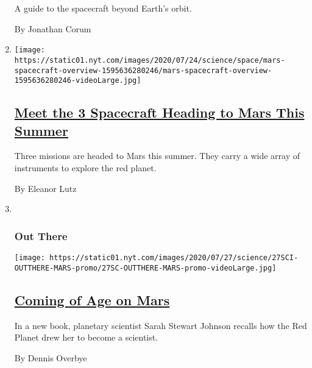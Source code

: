 \begin{enumerate}
  A guide to the spacecraft beyond Earth's orbit.

  By Jonathan Corum
\item
  \texttt{[image: https://static01.nyt.com/images/2020/07/24/science/space/mars-spacecraft-overview-1595636280246/mars-spacecraft-overview-1595636280246-videoLarge.jpg]}

  \hypertarget{meet-the-3-spacecraft-heading-to-mars-this-summer}{%
  \subsection{\texorpdfstring{\href{/interactive/2020/science/mars-perseverance-tianwen-hope.html}{Meet
  the 3 Spacecraft Heading to Mars This
  Summer}}{Meet the 3 Spacecraft Heading to Mars This Summer}}\label{meet-the-3-spacecraft-heading-to-mars-this-summer}}

  Three missions are headed to Mars this summer. They carry a wide array
  of instruments to explore the red planet.

  By Eleanor Lutz
\item ~
  \hypertarget{out-there}{%
  \subsubsection{Out There}\label{out-there}}

  \texttt{[image: https://static01.nyt.com/images/2020/07/27/science/27SCI-OUTTHERE-MARS-promo/27SC-OUTTHERE-MARS-promo-videoLarge.jpg]}

  \hypertarget{coming-of-age-on-mars}{%
  \subsection{\texorpdfstring{\href{/2020/07/27/science/mars-sarah-stewart-johnson.html}{Coming
  of Age on Mars}}{Coming of Age on Mars}}\label{coming-of-age-on-mars}}

  In a new book, planetary scientist Sarah Stewart Johnson recalls how
  the Red Planet drew her to become a scientist.

  By Dennis Overbye
\end{enumerate}


